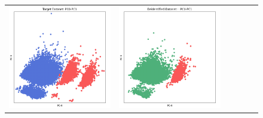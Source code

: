 \begin{figure}[p!]
\begin{tabular}{@{} M{0.166\textwidth} M{0.166\textwidth} | M{0.166\textwidth} M{0.166\textwidth} | M{0.166\textwidth} M{0.166\textwidth} @{}}
       \includegraphics[width=\linewidth]{z_YData.orig.png} &
       \includegraphics[width=\linewidth]{z_YData.syn.png} &

\end{tabular}
\end{figure}
